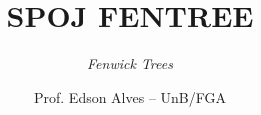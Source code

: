 \title{SPOJ FENTREE}
\subtitle{\textit{Fenwick Trees}}
\author{Prof. Edson Alves -- UnB/FGA}
\date{}
